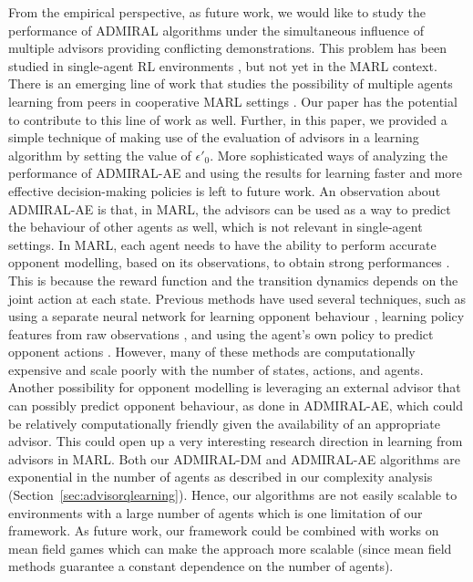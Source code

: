 \documentclass[jair, twoside,11pt,theapa]{article}
\begin{document}
From the empirical perspective, as future work, we would like to study the performance of ADMIRAL algorithms under the simultaneous influence of multiple advisors providing conflicting demonstrations. This problem has been studied in single-agent RL environments \citep{li2019two}, but not yet in the MARL context. There is an emerging line of work that studies the possibility of multiple agents learning from peers in cooperative MARL settings \citep{omidshafiei2019learning}. Our paper has the potential to contribute to this line of work as well. Further, in this paper, we provided a simple technique of making use of the evaluation of advisors in a learning algorithm by setting the value of $\epsilon'_0$. More sophisticated ways of analyzing the performance of ADMIRAL-AE and using the results for learning faster and more effective decision-making policies is left to future work. An observation about ADMIRAL-AE is that, in MARL, the advisors can be used as a way to predict the behaviour of other agents as well, which is not relevant in single-agent settings. In MARL, each agent needs to have the ability to perform accurate opponent modelling, based on its observations, to obtain strong performances \citep{hernandez2019survey}. This is because the reward function and the transition dynamics depends on the joint action at each state. Previous methods have used several techniques, such as using a separate neural network for learning opponent behaviour \citep{he2016opponent}, learning policy features from raw observations \citep{zhang2018deep}, and using the agent's own policy to predict opponent actions \citep{roberta2018modeling}. However, many of these methods are computationally expensive and scale poorly with the number of states, actions, and agents. Another possibility for opponent modelling is leveraging an external advisor that can possibly predict opponent behaviour, as done in ADMIRAL-AE, which could be relatively computationally friendly given the availability of an appropriate advisor. This could open up a very interesting research direction in learning from advisors in MARL. Both our ADMIRAL-DM and ADMIRAL-AE algorithms are exponential in the number of agents as described in our complexity analysis (Section~\ref{sec:advisorqlearning}). Hence, our algorithms are not easily scalable to environments with a large number of agents which is one limitation of our framework. As future work, our framework could be combined with works on mean field games \cite{lasry2007mean} which can make the approach more scalable (since mean field methods guarantee a constant dependence on the number of agents). 
\end{document}
